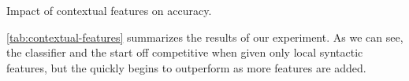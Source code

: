 \begin{table}[ht]
  \caption{
    Impact of contextual features on accuracy.
  }\label{tab:contextual-features}
\end{table}

\autoref{tab:contextual-features} summarizes the results of our experiment.
%
As we can see, the \linear classifier and the \hiddenFH start off
competitive when given only local syntactic features, but the \hiddenFH
quickly begins to outperform as more features are added.
%
